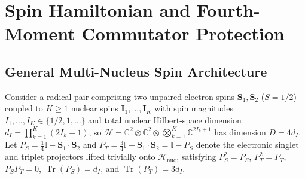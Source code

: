 \documentclass[twocolumn,10pt,amsmath,amssymb,floatfix]{revtex4-2}
\theoremstyle{plain}
\theoremstyle{definition}
\newcommand{\Tr}{\operatorname{Tr}}
\newcommand{\PS}{P_S}
\newcommand{\PT}{P_T}
\begin{document}
\section{Spin Hamiltonian and Fourth-Moment Commutator Protection}
\label{sec:moments}

\subsection{General Multi-Nucleus Spin Architecture}

Consider a radical pair comprising two unpaired electron spins $\mathbf{S}_1, \mathbf{S}_2$ ($S=1/2$) coupled to $K \ge 1$ nuclear spins $\mathbf{I}_1,\dots,\mathbf{I}_K$ with spin magnitudes $I_1,\dots,I_K \in \{1/2, 1, \dots\}$ and total nuclear Hilbert-space dimension $d_I = \prod_{k=1}^K (2I_k+1)$, so $\mathcal{H} = \mathbb{C}^2 \otimes \mathbb{C}^2 \otimes \bigotimes_{k=1}^K \mathbb{C}^{2I_k+1}$ has dimension $D = 4 d_I$. Let $\PS = \frac{1}{4}\mathbb{I} - \mathbf{S}_1\cdot\mathbf{S}_2$ and $\PT = \frac{3}{4}\mathbb{I} + \mathbf{S}_1\cdot\mathbf{S}_2 = \mathbb{I} - \PS$ denote the electronic singlet and triplet projectors lifted trivially onto $\mathcal{H}_{\mathrm{nuc}}$, satisfying $\PS^2=\PS$, $\PT^2=\PT$, $\PS\PT=0$, $\Tr(\PS)=d_I$, and $\Tr(\PT)=3d_I$.
\end{document}
